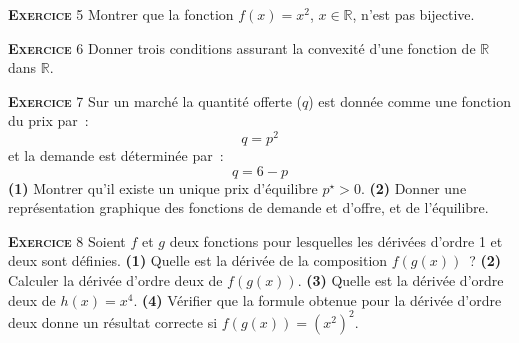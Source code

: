 \documentclass[10pt,a4paper,notitlepage]{article}
\newcommand{\exercice}[1]{\textsc{\textbf{Exercice}} #1}
\begin{document}
\bigskip

\exercice{5} Montrer que la fonction $f(x) = x^2$, $x\in\mathbb R$, n'est pas bijective.

\bigskip

\exercice{6} Donner trois conditions assurant la convexité d'une
fonction de $\mathbb R$ dans $\mathbb R$. 

\bigskip

\exercice{7} Sur un marché la quantité offerte ($q$) est donnée comme
une fonction du prix par :
\[
q = p^2
\]
et la demande est déterminée par :
\[
q = 6-p
\]
\textbf{(1)} Montrer qu'il existe un unique prix d'équilibre
$p^{\star}>0$. \textbf{(2)} Donner une représentation graphique des
fonctions de demande et d'offre, et de l'équilibre.     

\bigskip

\exercice{8} Soient $f$ et $g$ deux fonctions pour lesquelles les
dérivées d'ordre 1 et deux sont définies. \textbf{(1)} Quelle est la
dérivée de la composition $f(g(x))$ ? \textbf{(2)} Calculer la dérivée
d'ordre deux de $f(g(x))$. \textbf{(3)} Quelle est la dérivée d'ordre
deux de $h(x) = x^4$. \textbf{(4)} Vérifier que la formule
obtenue pour la dérivée d'ordre deux donne un résultat correcte si
$f(g(x)) = \left(x^2\right)^2$. 
\end{document}
